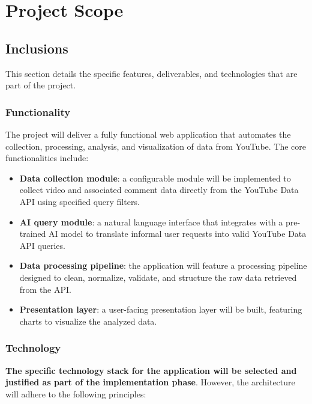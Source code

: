 \section{Project Scope}

\subsection{Inclusions}

This section details the specific features, deliverables, and technologies that are part of the project.

\subsubsection{Functionality}

The project will deliver a fully functional web application that automates the collection, processing, analysis, and visualization of data from YouTube. The core functionalities include:

\begin{itemize}
	\item \textbf{Data collection module}: a configurable module will be implemented to collect video and associated comment data directly from the YouTube Data API using specified query filters.

	\item \textbf{AI query module}: a natural language interface that integrates with a pre-trained AI model to translate informal user requests into valid YouTube Data API queries.

	\item \textbf{Data processing pipeline}: the application will feature a processing pipeline designed to clean, normalize, validate, and structure the raw data retrieved from the API.

	\item \textbf{Presentation layer}: a user-facing presentation layer will be built, featuring charts to visualize the analyzed data.
\end{itemize}

\subsubsection{Technology}

\textbf{The specific technology stack for the application will be selected and justified as part of the implementation phase}. However, the architecture will adhere to the following principles:

